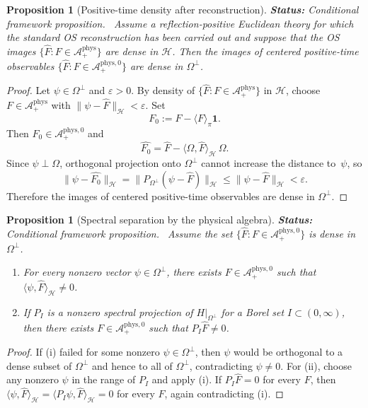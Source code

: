 \documentclass[12pt,a4paper]{article}
\theoremstyle{plain}
\newtheorem{proposition}[theorem]{Proposition}
\theoremstyle{definition}
\theoremstyle{remark}
\newcommand{\hilb}{\mathcal{H}}
\newcommand{\alg}{\mathcal{A}}
\newcommand{\status}[1]{\textnormal{\textbf{Status:} #1.}\ }
\begin{document}
\begin{proposition}[Positive-time density after reconstruction]
  \label{prop:positive-time-density}
  \status{Conditional framework proposition}
  Assume a reflection-positive Euclidean theory for which the standard
  OS reconstruction has been carried out and suppose that the OS
  images $\{\widehat{F}: F \in \alg^{\mathrm{phys}}_+\}$ are dense in
  $\hilb$. Then the images of centered positive-time observables
  $\{\widehat{F}: F \in \alg^{\mathrm{phys},0}_+\}$ are dense in
  $\Omega^\perp$.
\end{proposition}
\begin{proof}
  Let $\psi \in \Omega^\perp$ and $\varepsilon>0$. By density of
  $\{\widehat{F}: F \in \alg^{\mathrm{phys}}_+\}$ in $\hilb$, choose
  $F \in \alg^{\mathrm{phys}}_+$ with
  $\|\psi-\widehat{F}\|_\hilb<\varepsilon$. Set
  \[
    F_0 := F - \langle F\rangle_\pi \mathbf{1}.
  \]
  Then $F_0 \in \alg^{\mathrm{phys},0}_+$ and
  \[
    \widehat{F_0}
    = \widehat{F} - \langle \Omega,\widehat{F}\rangle_\hilb\,\Omega.
  \]
  Since $\psi \perp \Omega$, orthogonal projection onto
  $\Omega^\perp$ cannot increase the distance to~$\psi$, so
  \[
    \|\psi-\widehat{F_0}\|_\hilb
    = \|P_{\Omega^\perp}(\psi-\widehat{F})\|_\hilb
    \le \|\psi-\widehat{F}\|_\hilb
    < \varepsilon.
  \]
  Therefore the images of centered positive-time observables are dense
  in $\Omega^\perp$.
\end{proof}

\begin{proposition}[Spectral separation by the physical algebra]
  \label{prop:physical-separation}
  \status{Conditional framework proposition}
  Assume the set
  $\{\widehat{F}: F \in \alg^{\mathrm{phys},0}_+\}$ is dense in
  $\Omega^\perp$.
  \begin{enumerate}[nosep,label=(\roman*)]
  \item For every nonzero vector $\psi \in \Omega^\perp$, there exists
    $F \in \alg^{\mathrm{phys},0}_+$ such that
    $\langle \psi,\widehat{F}\rangle_\hilb \neq 0$.
  \item If $P_I$ is a nonzero spectral projection of
    $H|_{\Omega^\perp}$ for a Borel set $I \subset (0,\infty)$, then
    there exists $F \in \alg^{\mathrm{phys},0}_+$ such that
    $P_I\widehat{F} \neq 0$.
  \end{enumerate}
\end{proposition}
\begin{proof}
  If (i) failed for some nonzero $\psi \in \Omega^\perp$, then
  $\psi$ would be orthogonal to a dense subset of $\Omega^\perp$ and
  hence to all of $\Omega^\perp$, contradicting $\psi\neq 0$. For
  (ii), choose any nonzero $\psi$ in the range of $P_I$ and apply
  (i). If $P_I\widehat{F}=0$ for every $F$, then
  $\langle \psi,\widehat{F}\rangle_\hilb
  = \langle P_I\psi,\widehat{F}\rangle_\hilb = 0$ for every $F$,
  again contradicting (i).
\end{proof}
\end{document}
